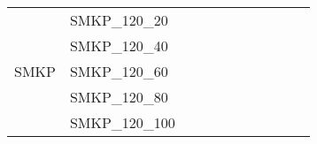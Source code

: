 \begin{table}[]
{\begin{tabular}{|c|l|ll|ll|ll|l|l|l|}
			\hline
			\multirow{5}{*}{SMKP}   & SMKP\_120\_20                 &                                   &                                  &                           &                          &                           &                          &                                       &                               & \\
			& SMKP\_120\_40                &                                   &                                  &                           &                          &                           &                          &                                       &                               & \\
			& SMKP\_120\_60                &                                   &                                  &                           &                          &                           &                          &                                       &                               & \\
			& SMKP\_120\_80                &                                   &                                  &                           &                          &                           &                          &                                       &                               & \\
			& SMKP\_120\_100               &                                   &                                  &                           &                          &                           &                          &                                       &                               & \\ 

\end{tabular}}
\end{table}
